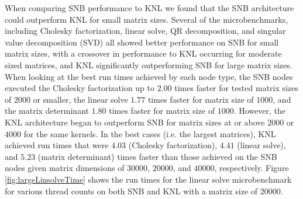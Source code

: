 When comparing SNB performance to KNL we found that the SNB architecture could outperform
KNL for small matrix sizes. Several of the microbenchmarks, including Cholesky
factorization, linear solve, QR decomposition, and singular value decomposition (SVD) all
showed better performance on SNB for small matrix sizes, with a crossover in performance
to KNL occurring for moderate sized matrices, and KNL significantly outperforming SNB for
large matrix sizes. When looking at the best run times achieved by each node type, the SNB
nodes executed the Cholesky factorization up to $2.00$ times faster for tested matrix
sizes of $2000$ or smaller, the linear solve $1.77$ times faster for matrix size of
$1000$, and the matrix determinant $1.80$ times faster for matrix size of $1000$. However,
the KNL architecture began to outperform SNB for matrix sizes at or above $2000$ or $4000$
for the same kernels. In the best cases (i.e. the largest matrices), KNL achieved run
times that were $4.03$ (Cholesky factorization), $4.41$ (linear solve), and $5.23$ (matrix
determinant) times faster than those achieved on the SNB nodes given matrix dimensions of
$30000$, $20000$, and $40000$, respectively. Figure \ref{fig:largeLinsolveTime} shows the
run times for the linear solve microbenchmark for various thread counts on both SNB and
KNL with a matrix size of $20000$.

